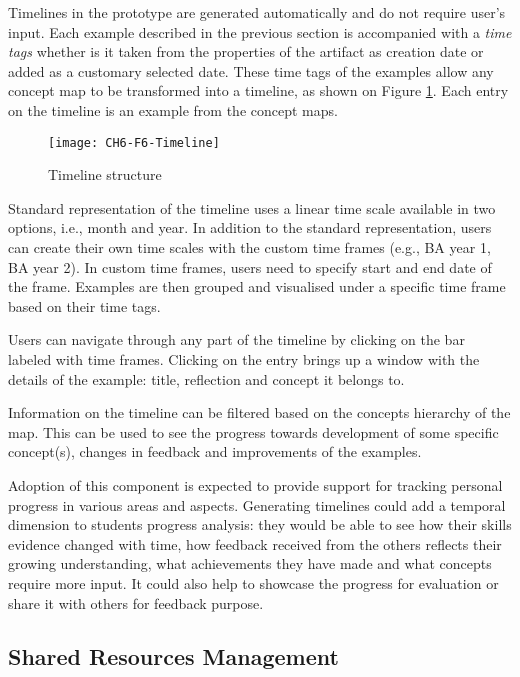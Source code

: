 Timelines in the prototype are generated automatically and do not require
user's input. Each example described in the previous section is accompanied with
a \textit{time tags} whether is it taken from the properties of the artifact as
creation date or added as a customary selected date. These time tags of the
examples allow any concept map to be transformed into a timeline, as shown on
Figure \ref{fig:timeline}. Each entry on the timeline is an example from the
concept maps.

\begin{figure}[htb]
\centering 
\texttt{[image: CH6-F6-Timeline]}
\caption{Timeline structure}
\label{fig:timeline}
\end{figure}

Standard representation of the timeline uses a linear time scale available in
two options, i.e., month and year. In addition to the standard representation,
users can create their own time scales with the custom time frames (e.g., BA
year 1, BA year 2). In custom time frames, users need to specify start and end
date of the frame. Examples are then grouped and visualised under a specific
time frame based on their time tags. 

Users can navigate through any part of the timeline by clicking on the bar
labeled with time frames. Clicking on the entry brings up a window with the
details of the example: title, reflection and concept it belongs to.

Information on the timeline can be filtered based on the concepts hierarchy of
the map. This can be used to see the progress towards development of some
specific concept(s), changes in feedback and improvements of the examples.

Adoption of this component is expected to provide support for tracking personal
progress in various areas and aspects. Generating timelines could add a temporal
dimension to students progress analysis: they would be able to see how their
skills evidence changed with time, how feedback received from the others
reflects their growing understanding, what achievements they have made and what
concepts require more input. It could also help to showcase the progress for
evaluation or share it with others for feedback purpose.

\subsection{Shared Resources Management}
\label{sec:sharing}

